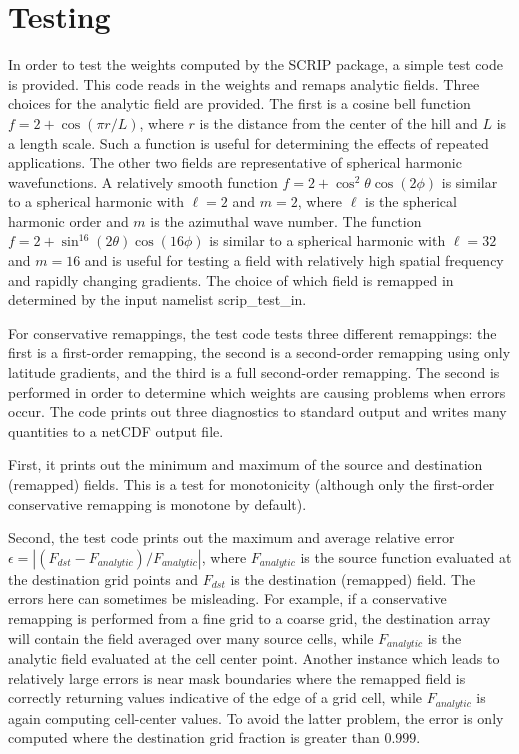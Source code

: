 \documentclass[12pt]{report}
\begin{document}
\section{Testing}

In order to test the weights computed by the SCRIP package,
a simple test code is provided.  This code reads in the
weights and remaps analytic fields.  Three choices for the
analytic field are provided.  The first is a cosine bell
function $f=2+\cos(\pi r/L)$, where $r$ is the distance from
the center of the hill and $L$ is a length scale.  Such a
function is useful for determining the effects of repeated
applications.  The other two fields are representative of
spherical harmonic wavefunctions.  A relatively smooth function
$f=2+\cos^2\theta\cos(2\phi)$ is similar to a spherical
harmonic with $\ell=2$ and $m=2$, where $\ell$ is the
spherical harmonic order and $m$ is the azimuthal wave number.
The function
$f=2+\sin^{16}(2\theta)\cos(16\phi)$ is similar to a
spherical harmonic with $\ell=32$ and $m=16$ and is useful
for testing a field with relatively high spatial
frequency and rapidly changing gradients.  The choice of
which field is remapped in determined by the input namelist
scrip\_test\_in.

For
conservative remappings, the test code tests three different
remappings: the first is a first-order remapping, the second
is a second-order remapping using only latitude gradients,
and the third is a full second-order remapping.  The second
is performed in order to determine which weights are
causing problems when errors occur.  The code
prints out three diagnostics to standard output and writes
many quantities to a netCDF output file.

First, it prints out the minimum and maximum of the source
and destination (remapped) fields.  This is a test for
monotonicity (although only the first-order conservative
remapping is monotone by default).

Second, the test code prints out the maximum and average
relative error $\epsilon =
|(F_{dst} - F_{analytic})/F_{analytic}|$, where
$F_{analytic}$ is the source function evaluated at the
destination grid points and $F_{dst}$ is the destination
(remapped) field.  The errors here can sometimes be misleading.
For example, if a conservative remapping is performed from
a fine grid to a coarse grid, the destination array will
contain the field averaged over many source cells, while
$F_{analytic}$ is the analytic field evaluated at the cell
center point.  Another instance which leads to relatively
large errors is near mask boundaries where the remapped
field is correctly returning values indicative of the edge
of a grid cell, while $F_{analytic}$ is again computing
cell-center values. To avoid the latter problem, the error is
only computed where the destination grid fraction
is greater than $0.999$.
\end{document}
